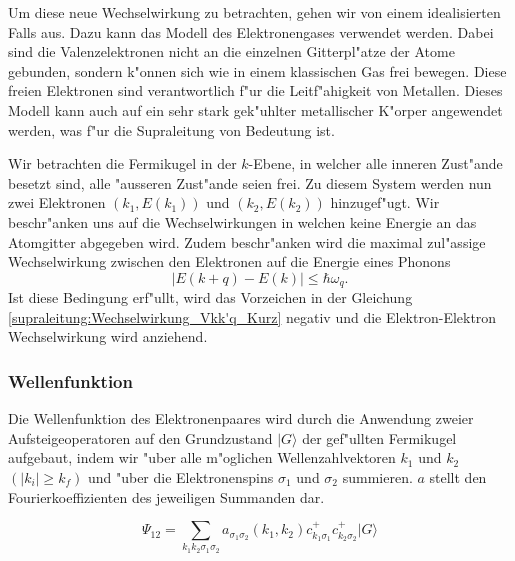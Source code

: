 \begin{refsection}
Um diese neue Wechselwirkung zu betrachten, gehen wir von einem idealisierten Falls aus.
Dazu kann das Modell des Elektronengases verwendet werden.
Dabei sind die Valenzelektronen nicht an die einzelnen Gitterpl"atze der Atome gebunden,
sondern k"onnen sich wie in einem klassischen Gas frei bewegen.
Diese freien Elektronen sind verantwortlich f"ur die Leitf"ahigkeit von Metallen.
Dieses Modell kann auch auf ein sehr stark gek"uhlter metallischer K"orper angewendet werden,
was f"ur die Supraleitung von Bedeutung ist.

Wir betrachten die Fermikugel in der $k$-Ebene, in welcher alle inneren Zust"ande besetzt sind,
alle "ausseren Zust"ande seien frei.
Zu diesem System werden nun zwei Elektronen $(k_1,E(k_1))$ und $(k_2,E(k_2))$ hinzugef"ugt.
Wir beschr"anken uns auf die Wechselwirkungen in welchen keine Energie an das Atomgitter abgegeben wird.
Zudem beschr"anken wird die maximal zul"assige Wechselwirkung zwischen den Elektronen auf die
Energie eines Phonons
\begin{equation}
|E(k+q)-E(k)|\le\hbar\omega_q .
\label{supraleitung:Phonon Energie}
\end{equation}
Ist diese Bedingung erf"ullt, wird das Vorzeichen in der Gleichung \ref{supraleitung:Wechselwirkung_Vkk'q_Kurz}
negativ und die Elektron-Elektron Wechselwirkung wird anziehend.

\subsubsection{Wellenfunktion}
Die Wellenfunktion des Elektronenpaares wird durch die Anwendung zweier Aufsteigeoperatoren
auf den Grundzustand $|G\rangle$ der gef"ullten Fermikugel aufgebaut, indem wir "uber
alle m"oglichen Wellenzahlvektoren $k_1$ und $k_2$ $(|k_i| \ge k_f)$ und "uber
die Elektronenspins $\sigma_1$ und $\sigma_2$ summieren.
$a$ stellt den Fourierkoeffizienten des jeweiligen Summanden dar.

\begin{equation}
\Psi_{12}=\sum \limits_{k_1k_2\sigma_1\sigma_2} a_{\sigma_1\sigma_2}
(k_1,k_2)c^+_{k_1\sigma_1}c^+_{k_2\sigma_2}|G\rangle
\label{supraleitung:WellenfktAllg}
\end{equation}


\end{refsection}
